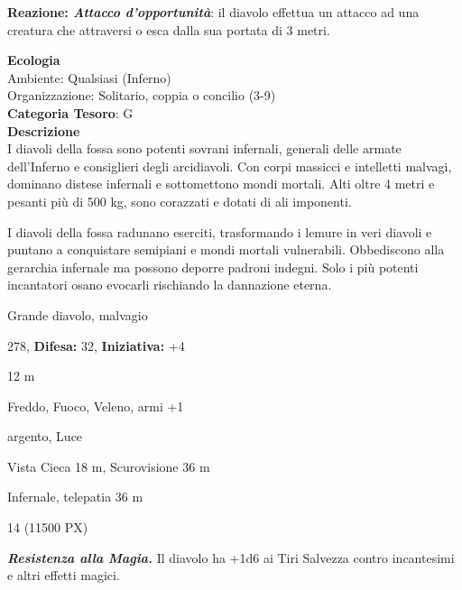 \begin{multicols}{2}
{\textbf{Reazione: \emph{Attacco d'opportunità}}: il diavolo effettua un attacco ad una creatura che attraversi o esca dalla sua portata di 3 metri.

\textbf{Ecologia}\\
Ambiente: Qualsiasi (Inferno)\\
Organizzazione: Solitario, coppia o concilio (3-9)\\
\textbf{Categoria Tesoro}: G\\
\textbf{Descrizione}\\
I diavoli della fossa sono potenti sovrani infernali, generali delle armate dell'Inferno e consiglieri degli arcidiavoli. Con corpi massicci e intelletti malvagi, dominano distese infernali e sottomettono mondi mortali. Alti oltre 4 metri e pesanti più di 500 kg, sono corazzati e dotati di ali imponenti.

I diavoli della fossa radunano eserciti, trasformando i lemure in veri diavoli e puntano a conquistare semipiani e mondi mortali vulnerabili. Obbediscono alla gerarchia infernale ma possono deporre padroni indegni. Solo i più potenti incantatori osano evocarli rischiando la dannazione eterna.

\noindent
\begin{description}[noitemsep, topsep=0pt, parsep=0pt, partopsep=0pt, leftmargin=0cm, labelwidth=2.2cm]
	\item[\textbf{Taglia/Tipo:}] Grande diavolo, malvagio
	\item[\textbf{Caratt.:}] 
	\item[\textbf{Punti Ferita:}] 278,  \textbf{Difesa:} 32,  \textbf{Iniziativa:} +4
	\item[\textbf{Movimento:}] 12 m
	\item[\textbf{Tiri Salvez.:}] 
	\item[\textbf{Imm. Danni:}] Freddo, Fuoco, Veleno, armi +1
	\item[\textbf{Vulnerabilità:}] argento, Luce
	\item[\textbf{Sensi:}] Vista Cieca 18 m, Scurovisione 36 m
	\item[\textbf{Linguaggi:}] Infernale, telepatia 36 m
	\item[\textbf{Sfida:}] 14 (11500 PX)\smallskip
\end{description}

\emph{\textbf{Resistenza alla Magia.}} Il diavolo ha +1d6 ai Tiri Salvezza contro incantesimi e altri effetti magici.

}
\end{multicols}
